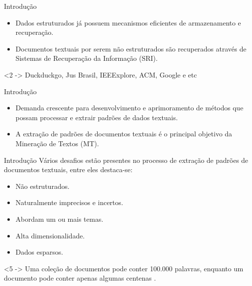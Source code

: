 \documentclass[brazil]{beamer}
\begin{document}
\begin{frame}{Introdução}
  \begin{itemize}
    \item<1 -> Dados estruturados já possuem mecanismos eficientes de armazenamento e recuperação.
    \item<2 -> \alert{Documentos textuais} por serem \alert{não estruturados} são recuperados
      através de Sistemas de Recuperação da Informação (SRI). 
  \end{itemize}
  \begin{examples}<2 ->
    Duckduckgo, Jus Brasil, IEEExplore, ACM, Google e etc 
  \end{examples}
\end{frame}


\begin{frame}{Introdução}
  \begin{itemize}
    \item Demanda crescente para desenvolvimento e aprimoramento de métodos que possam
      processar e \alert{extrair padrões} de \alert{dados textuais}. 
    \item A extração de padrões de documentos textuais é o principal objetivo da Mineração de Textos
      (MT).
  \end{itemize}
\end{frame}

\begin{frame}{Introdução}
  Vários desafios estão presentes no processo de extração de padrões de documentos textuais, entre
  eles destaca-se:
  \begin{itemize}
    \item<1 -> Não estruturados.
    \item<2 -> Naturalmente \alert{imprecisos} e \alert{incertos}. 
    \item<3 -> Abordam um ou mais temas. 
    \item<4 -> \alert{Alta dimensionalidade}.
    \item<5 -> Dados \alert{esparsos}.
  \end{itemize}
  \begin{examples}<5 ->
    Uma coleção de documentos pode conter 100.000 palavras, enquanto um documento pode conter apenas
    algumas centenas \cite{Aggarwal2012}.
  \end{examples}
\end{frame}
\end{document}
